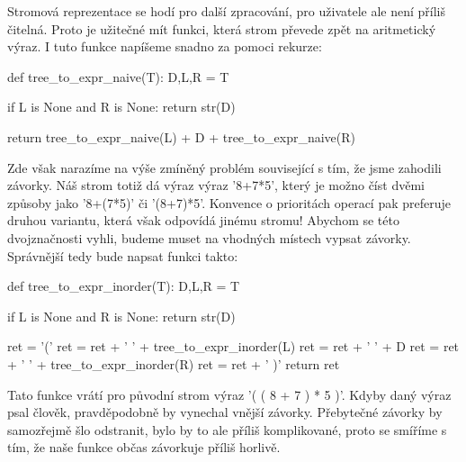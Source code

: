 Stromová reprezentace se hodí pro další zpracování, pro uživatele ale není 
příliš čitelná. Proto je užitečné mít funkci, která strom převede zpět na
aritmetický výraz. I tuto funkce napíšeme snadno za pomoci rekurze:

\begin{python}
def tree_to_expr_naive(T):
    D,L,R = T
    
    if L is None and R is None:
        return str(D)
    
    return tree_to_expr_naive(L) + D + tree_to_expr_naive(R)
\end{python}

Zde však narazíme na výše zmíněný problém související s tím, že jsme zahodili 
závorky. Náš strom totiž dá výraz výraz '8+7*5', který je možno číst dvěmi
způsoby jako '8+(7*5)' či '(8+7)*5'. Konvence o prioritách operací pak preferuje
druhou variantu, která však odpovídá jinému stromu! Abychom se této dvojznačnosti
vyhli, budeme muset na vhodných místech vypsat závorky. Správnější tedy
bude napsat funkci takto:

\begin{python}
def tree_to_expr_inorder(T):
    D,L,R = T
    
    if L is None and R is None:
        return str(D)
    
    ret = '('
    ret = ret + ' ' + tree_to_expr_inorder(L)
    ret = ret + ' ' + D
    ret = ret + ' ' + tree_to_expr_inorder(R)
    ret = ret + ' )'
    return ret
\end{python}

Tato funkce vrátí pro původní strom výraz '( ( 8 + 7 ) * 5 )'. Kdyby daný výraz psal
člověk, pravděpodobně by vynechal vnější závorky. Přebytečné závorky by samozřejmě
šlo odstranit, bylo by to ale příliš komplikované, proto se smíříme s tím, že
naše funkce občas závorkuje příliš horlivě. 

